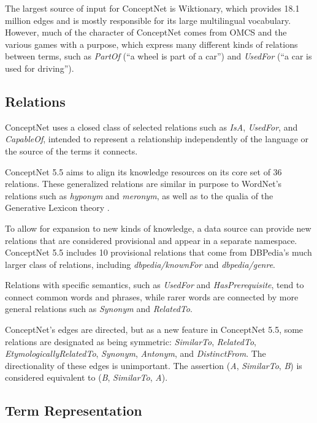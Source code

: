 \documentclass[letterpaper]{article}
\begin{document}
The largest source of input for ConceptNet is Wiktionary, which provides
18.1 million edges and is mostly responsible for its large multilingual
vocabulary. However, much of the character of ConceptNet comes from OMCS
and the various games with a purpose, which express many different kinds
of relations between terms, such as \emph{PartOf} (``a wheel is part of
a car'') and \emph{UsedFor} (``a car is used for driving'').


\subsection{Relations}\label{relations}

ConceptNet uses a closed class of selected relations such as \emph{IsA},
\emph{UsedFor}, and \emph{CapableOf}, intended to
represent a relationship independently of the language or the source of
the terms it connects.

ConceptNet 5.5 aims to align its knowledge resources on its core set of 36
relations. These generalized relations are similar in purpose to WordNet's
relations such as \emph{hyponym} and \emph{meronym}, as well as to the qualia
of the Generative Lexicon theory \cite{pustejovsky1991generative}.

To allow for expansion to new kinds of knowledge, a data
source can provide new relations that are considered provisional and
appear in a separate namespace. ConceptNet 5.5 includes 10 provisional
relations that come from DBPedia's much larger class of relations,
including \emph{dbpedia/knownFor} and \emph{dbpedia/genre}.

Relations with specific semantics, such as \emph{UsedFor} and
\emph{HasPrerequisite}, tend to connect common words and phrases, while
rarer words are connected by more general relations such as
\emph{Synonym} and \emph{RelatedTo}.

ConceptNet's edges are directed, but as a new feature in ConceptNet 5.5,
some relations are designated as being symmetric: \emph{SimilarTo},
\emph{RelatedTo}, \emph{EtymologicallyRelatedTo}, \emph{Synonym},
\emph{Antonym}, and \emph{DistinctFrom}. The directionality of these
edges is unimportant. The assertion (\emph{A}, \emph{SimilarTo},
\emph{B}) is considered equivalent to (\emph{B}, \emph{SimilarTo},
\emph{A}).


\subsection{Term Representation}\label{term-representation}
\end{document}
